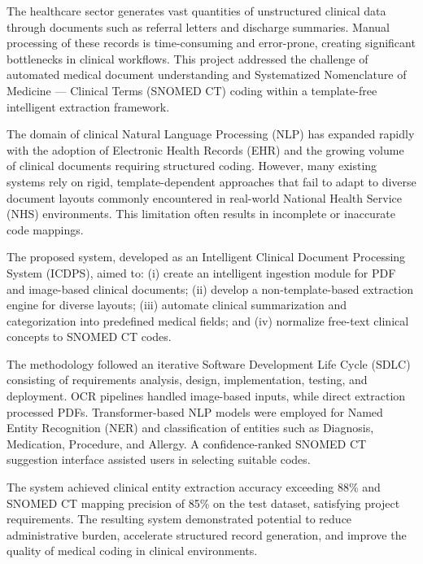 \vspace{-1cm}

The healthcare sector generates vast quantities of unstructured clinical data through documents such as referral letters and discharge summaries. Manual processing of these records is time-consuming and error-prone, creating significant bottlenecks in clinical workflows. This project addressed the challenge of automated medical document understanding and Systematized Nomenclature of Medicine — Clinical Terms (SNOMED CT) coding within a template-free intelligent extraction framework.

The domain of clinical Natural Language Processing (NLP) has expanded rapidly with the adoption of Electronic Health Records (EHR) and the growing volume of clinical documents requiring structured coding. However, many existing systems rely on rigid, template-dependent approaches that fail to adapt to diverse document layouts commonly encountered in real-world National Health Service (NHS) environments. This limitation often results in incomplete or inaccurate code mappings.

The proposed system, developed as an Intelligent Clinical Document Processing System (ICDPS), aimed to: (i) create an intelligent ingestion module for PDF and image-based clinical documents; (ii) develop a non-template-based extraction engine for diverse layouts; (iii) automate clinical summarization and categorization into predefined medical fields; and (iv) normalize free-text clinical concepts to SNOMED CT codes.

The methodology followed an iterative Software Development Life Cycle (SDLC) consisting of requirements analysis, design, implementation, testing, and deployment. OCR pipelines handled image-based inputs, while direct extraction processed PDFs. Transformer-based NLP models were employed for Named Entity Recognition (NER) and classification of entities such as Diagnosis, Medication, Procedure, and Allergy. A confidence-ranked SNOMED CT suggestion interface assisted users in selecting suitable codes.

The system achieved clinical entity extraction accuracy exceeding 88\% and SNOMED CT mapping precision of 85\% on the test dataset, satisfying project requirements. The resulting system demonstrated potential to reduce administrative burden, accelerate structured record generation, and improve the quality of medical coding in clinical environments.


\pagebreak